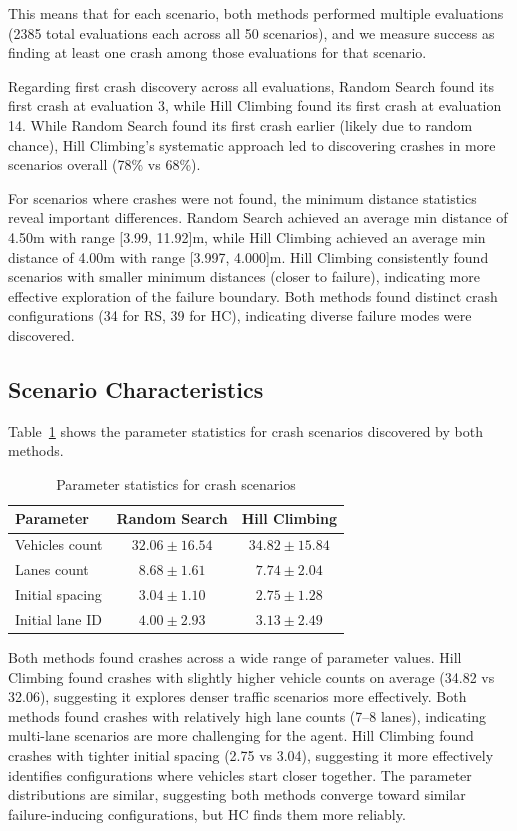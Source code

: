\documentclass[11pt,a4paper]{article}
\begin{document}
This means that for each scenario, both methods performed multiple evaluations (2385 total evaluations each across all 50 scenarios), and we measure success as finding at least one crash among those evaluations for that scenario.

Regarding first crash discovery across all evaluations, Random Search found its first crash at evaluation 3, while Hill Climbing found its first crash at evaluation 14. While Random Search found its first crash earlier (likely due to random chance), Hill Climbing's systematic approach led to discovering crashes in more scenarios overall (78\% vs 68\%).

For scenarios where crashes were not found, the minimum distance statistics reveal important differences. Random Search achieved an average min distance of 4.50m with range [3.99, 11.92]m, while Hill Climbing achieved an average min distance of 4.00m with range [3.997, 4.000]m. Hill Climbing consistently found scenarios with smaller minimum distances (closer to failure), indicating more effective exploration of the failure boundary. Both methods found distinct crash configurations (34 for RS, 39 for HC), indicating diverse failure modes were discovered.

\subsection{Scenario Characteristics}

Table~\ref{tab:crash_params} shows the parameter statistics for crash scenarios discovered by both methods.

\begin{table}[H]
\centering
\begin{tabular}{lcc}
\toprule
\textbf{Parameter} & \textbf{Random Search} & \textbf{Hill Climbing} \\
\midrule
Vehicles count & $32.06 \pm 16.54$ & $34.82 \pm 15.84$ \\
Lanes count & $8.68 \pm 1.61$ & $7.74 \pm 2.04$ \\
Initial spacing & $3.04 \pm 1.10$ & $2.75 \pm 1.28$ \\
Initial lane ID & $4.00 \pm 2.93$ & $3.13 \pm 2.49$ \\
\bottomrule
\end{tabular}
\caption{Parameter statistics for crash scenarios}
\label{tab:crash_params}
\end{table}

Both methods found crashes across a wide range of parameter values. Hill Climbing found crashes with slightly higher vehicle counts on average (34.82 vs 32.06), suggesting it explores denser traffic scenarios more effectively. Both methods found crashes with relatively high lane counts (7--8 lanes), indicating multi-lane scenarios are more challenging for the agent. Hill Climbing found crashes with tighter initial spacing (2.75 vs 3.04), suggesting it more effectively identifies configurations where vehicles start closer together. The parameter distributions are similar, suggesting both methods converge toward similar failure-inducing configurations, but HC finds them more reliably.
\end{document}
